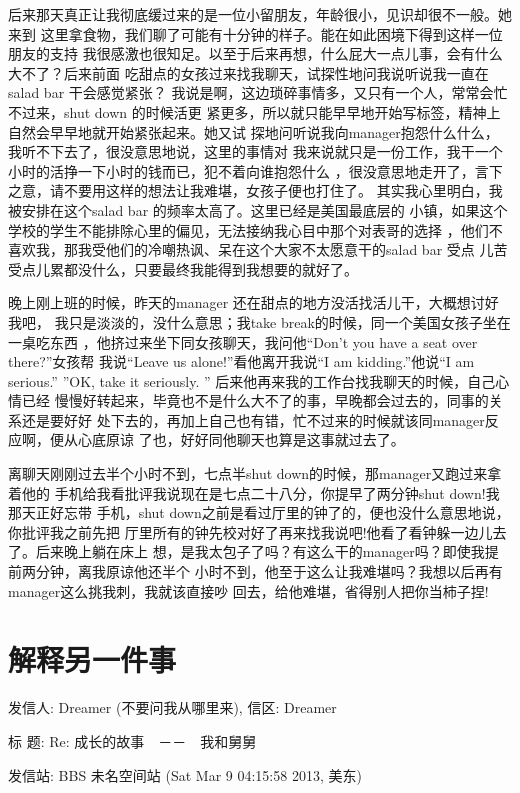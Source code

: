 \documentclass[12pt]{book}
\begin{document}
后来那天真正让我彻底缓过来的是一位小留朋友，年龄很小，见识却很不一般。她来到
这里拿食物，我们聊了可能有十分钟的样子。能在如此困境下得到这样一位朋友的支持
我很感激也很知足。以至于后来再想，什么屁大一点儿事，会有什么大不了？后来前面
吃甜点的女孩过来找我聊天，试探性地问我说听说我一直在salad bar 干会感觉紧张？
我说是啊，这边琐碎事情多，又只有一个人，常常会忙不过来，shut down 的时候活更
紧更多，所以就只能早早地开始写标签，精神上自然会早早地就开始紧张起来。她又试
探地问听说我向manager抱怨什么什么，我听不下去了，很没意思地说，这里的事情对
我来说就只是一份工作，我干一个小时的活挣一下小时的钱而已，犯不着向谁抱怨什么
，很没意思地走开了，言下之意，请不要用这样的想法让我难堪，女孩子便也打住了。
其实我心里明白，我被安排在这个salad bar 的频率太高了。这里已经是美国最底层的
小镇，如果这个学校的学生不能排除心里的偏见，无法接纳我心目中那个对表哥的选择
，他们不喜欢我，那我受他们的冷嘲热讽、呆在这个大家不太愿意干的salad bar 受点
儿苦受点儿累都没什么，只要最终我能得到我想要的就好了。

晚上刚上班的时候，昨天的manager 还在甜点的地方没活找活儿干，大概想讨好我吧，
我只是淡淡的，没什么意思；我take break的时候，同一个美国女孩子坐在一桌吃东西
，他挤过来坐下同女孩聊天，我问他“Don’t you have a seat over there?”女孩帮
我说“Leave us alone!”看他离开我说“I  am kidding.”他说“I  am serious.”
”OK, take it seriously. ” 后来他再来我的工作台找我聊天的时候，自己心情已经
慢慢好转起来，毕竟也不是什么大不了的事，早晚都会过去的，同事的关系还是要好好
处下去的，再加上自己也有错，忙不过来的时候就该同manager反应啊，便从心底原谅
了也，好好同他聊天也算是这事就过去了。

离聊天刚刚过去半个小时不到，七点半shut down的时候，那manager又跑过来拿着他的
手机给我看批评我说现在是七点二十八分，你提早了两分钟shut down!我那天正好忘带
手机，shut down之前是看过厅里的钟了的，便也没什么意思地说，你批评我之前先把
厅里所有的钟先校对好了再来找我说吧!他看了看钟躲一边儿去了。后来晚上躺在床上
想，是我太包子了吗？有这么干的manager吗？即使我提前两分钟，离我原谅他还半个
小时不到，他至于这么让我难堪吗？我想以后再有manager这么挑我刺，我就该直接吵
回去，给他难堪，省得别人把你当柿子捏!
\section{解释另一件事}
\label{sec-12-4}
发信人: Dreamer (不要问我从哪里来), 信区: Dreamer

标  题: Re: 成长的故事　－－　我和舅舅

发信站: BBS 未名空间站 (Sat Mar  9 04:15:58 2013, 美东)
\end{document}
